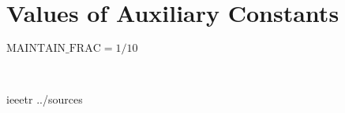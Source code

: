 \documentclass[12pt]{article}
\begin{document}
~\newpage

\section{Values of Auxiliary Constants}

$\text{MAINTAIN\_FRAC} = 1/10$

~\newpage

 {ieeetr}
 {../sources}



\end{document}
